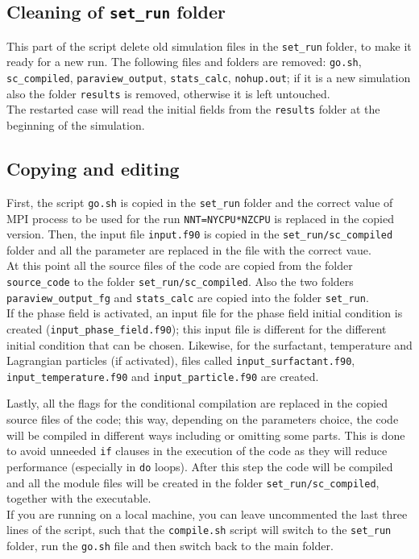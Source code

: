 \subsection{Cleaning of \texttt{set\_run} folder}
\label{sec: restart}
This part of the script delete old simulation files in the \texttt{set\_run} folder, to make it ready for a new run. The following files and folders are removed: \texttt{go.sh}, \texttt{sc\_compiled}, \texttt{paraview\_output}, \texttt{stats\_calc}, \texttt{nohup.out}; if it is a new simulation also the folder \texttt{results} is removed, otherwise it is left untouched.\\
The restarted case will read the initial fields from the \texttt{results} folder at the beginning of the simulation.

\subsection{Copying and editing}
First, the script \texttt{go.sh} is copied in the \texttt{set\_run} folder and the correct value of MPI process to be used for the run \texttt{NNT=NYCPU*NZCPU} is replaced in the copied version. 
Then, the input file \texttt{input.f90} is copied in the \texttt{set\_run/sc\_compiled} folder and all the parameter are replaced in the file with the correct vaue.\\
At this point all the source files of the code are copied from the folder \texttt{source\_code} to the folder \texttt{set\_run/sc\_compiled}. Also the two folders \texttt{paraview\_output\_fg} and \texttt{stats\_calc} are copied into the folder \texttt{set\_run}.\\
If the phase field is activated, an input file for the phase field initial condition is created (\texttt{input\_phase\_field.f90}); this input file is different for the different initial condition that can be chosen.
Likewise, for the surfactant, temperature and Lagrangian particles (if activated), files called \texttt{input\_surfactant.f90}, \texttt{input\_temperature.f90} and \texttt{input\_particle.f90} are created.

Lastly, all the flags for the conditional compilation are replaced in the copied source files of the code; this way, depending on the parameters choice, the code will be compiled in different ways including or omitting some parts. This is done to avoid unneeded \texttt{if} clauses in the execution of the code as they will reduce performance (especially in \texttt{do} loops). 
After this step the code will be compiled and all the module files will be created in the folder \texttt{set\_run/sc\_compiled}, together with the executable.\\
If you are running on a local machine, you can leave uncommented the last three lines of the script, such that the \texttt{compile.sh} script will switch to the \texttt{set\_run} folder, run the \texttt{go.sh} file and then switch back to the main folder.



